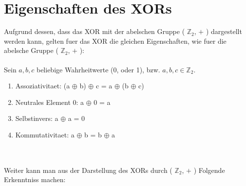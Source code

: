 \documentclass[a4paper,10pt,ngerman]{scrartcl}
\begin{document}
\section{Eigenschaften des XORs}
Aufgrund dessen, dass das XOR mit der abelschen Gruppe ( \(\mathbb{Z}_{2}\), \(+\) ) dargestellt werden kann, gelten fuer das XOR die gleichen Eigenschaften, wie fuer die abelsche Gruppe ( \(\mathbb{Z}_{2}\), \(+\) ):
\\\\Sein \(a, b, c\) beliebige Wahrheitwerte (0, oder 1), bzw. \(a, b, c \in \mathbb{Z}_{2}\).
\begin{enumerate}
	\item Assoziativitaet: (a \(\oplus\) b) \(\oplus\) c = a \(\oplus\) (b \(\oplus\) c)
	\item Neutrales Element 0: a \(\oplus\) 0 = a
	\item Selbstinvers: a \(\oplus\) a = 0
	\item Kommutativitaet: a \(\oplus\) b = b \(\oplus\) a
\end{enumerate}
\\\\Weiter kann man aus der Darstellung des XORs durch ( \(\mathbb{Z}_{2}\), \(+\) ) Folgende Erkenntniss machen:\\
\end{document}
